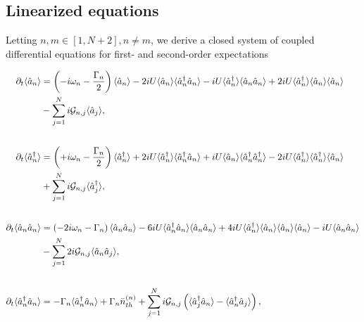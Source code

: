 \subsection{Linearized equations}
Letting $n, m \in \left[1, N+2\right], n \ne m$, we derive a closed system of coupled differential equations for first- and second-order expectations


\begingroup
\allowdisplaybreaks
\begin{align}\label{eqn:linearsystem}
\partial_t\langle\hat{a}_n\rangle &= \left(- i \omega_n - \frac{\Gamma_n}{2}\right)\langle\hat{a}_n\rangle - 2 i U \langle\hat{a}_n\rangle\langle\hat{a}_n^\dagger\hat{a}_n\rangle - i U \langle\hat{a}_n^\dagger\rangle\langle\hat{a}_n\hat{a}_n\rangle + 2 i U \langle\hat{a}_n^\dagger\rangle \langle\hat{a}_n\rangle\langle\hat{a}_n\rangle \notag \\
&- \sum_{j=1}^N i \mathcal{G}_{n, j} \langle\hat{a}_j\rangle, \notag \\[18pt]
%
%
\partial_t\langle\hat{a}_n^\dagger\rangle &= \left(+ i \omega_n - \frac{\Gamma_n}{2} \right) \langle\hat{a}_n^\dagger\rangle + 2 i U \langle\hat{a}_n^\dagger\rangle\langle\hat{a}_n^\dagger\hat{a}_n\rangle + i U \langle\hat{a}_n\rangle\langle\hat{a}_n^\dagger\hat{a}_n^\dagger\rangle - 2 i U\langle\hat{a}_n^\dagger\rangle\langle\hat{a}_n^\dagger\rangle\langle\hat{a}_n\rangle \notag \\
&+ \sum_{j=1}^N i \mathcal{G}_{n,j}\langle\hat{a}_j^\dagger\rangle, \notag \\[18pt]
%
%
\partial_t\langle\hat{a}_n\hat{a}_n\rangle &= \left( - 2 i \omega_n - \Gamma_n\right) \langle\hat{a}_n\hat{a}_n\rangle - 6 i U \langle\hat{a}_n^\dagger \hat{a}_n\rangle \langle\hat{a}_n\hat{a}_n\rangle + 4 i U \langle\hat{a}_n^\dagger\rangle \langle\hat{a}_n\rangle \langle\hat{a}_n\rangle\langle\hat{a}_n\rangle - i U \langle \hat{a}_n\hat{a}_n\rangle \notag \\
&- \sum_{j=1}^N 2 i \mathcal{G}_{n, j}\langle\hat{a}_n\hat{a}_j\rangle,  \notag \\[18pt]
%
%
\partial_t \langle\hat{a}_n^\dagger\hat{a}_n\rangle &= - \Gamma_n\langle\hat{a}_n^\dagger\hat{a}_n\rangle + \Gamma_n \bar{n}_{th}^{\left(n\right)} + \sum_{j=1}^N i \mathcal{G}_{n, j}\left(\langle\hat{a}_j^\dagger\hat{a}_n\rangle - \langle\hat{a}_n^\dagger\hat{a}_j\rangle\right), \notag \\[18pt] 
%
%
%
%

\end{align}
